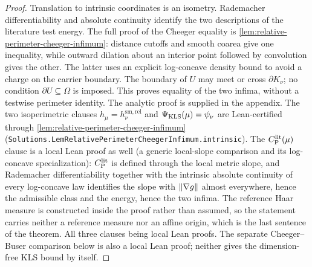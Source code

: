 \begin{proof}
  \leanok
  Translation to intrinsic coordinates is an isometry. Rademacher differentiability and
  absolute continuity identify the two descriptions of the literature test energy.
  The full proof of the Cheeger equality is \cref{lem:relative-perimeter-cheeger-infimum}:
  distance cutoffs and smooth coarea give one inequality, while outward dilation about an
  interior point followed by convolution gives the other. The latter uses an explicit
  log-concave density bound to avoid a charge on the carrier boundary. The boundary of $U$
  may meet or cross $\partial K_\nu$; no condition $\partial U\subseteq\Omega$ is imposed.
  This proves equality of the two infima, without a testwise perimeter identity. The analytic
  proof is supplied in the appendix. The two isoperimetric clauses $h_\mu=h_\nu^{\mathrm{sm,rel}}$
  and $\Psi_{\mathrm{KLS}}(\mu)=\psi_\nu$ are Lean-certified through
  \cref{lem:relative-perimeter-cheeger-infimum}
  (\texttt{Solutions.LemRelativePerimeterCheegerInfimum.intrinsic}).  The
  $C_{\mathrm P}^{\mathrm{lit}}(\mu)$ clause is a local Lean proof as well
  (a generic local-slope comparison and its log-concave specialization): $C_{\mathrm P}^{\mathrm{lit}}$ is defined through the local
  metric slope, and Rademacher differentiability together with the intrinsic absolute continuity of
  every log-concave law identifies the slope with $\lVert\nabla g\rVert$ almost everywhere, hence the
  admissible class and the energy, hence the two infima.  The reference Haar measure is
  constructed inside the proof rather than assumed, so the statement carries neither a reference
  measure nor an affine origin, which is the last sentence of the theorem.  All three clauses being
  local Lean proofs.  The separate
  Cheeger--Buser comparison below is also a local Lean proof;
  neither gives the dimension-free KLS bound by itself.
\end{proof}

